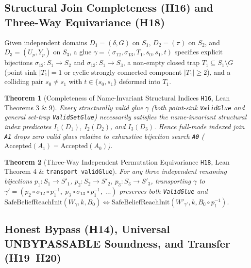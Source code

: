 \documentclass[10pt,a4paper]{article}
\newcommand{\code}[1]{\nolinkurl{#1}}
\newtheorem{theorem}{Theorem}[section]
\begin{document}
\subsection{Structural Join Completeness (H16) and Three-Way Equivariance (H18)}

Given independent domains $D_1 = (\delta, G)$ on $S_1$, $D_2 = (\pi)$ on $S_2$, and $D_3 = (U_p, Y_p)$ on $S_3$, a glue $\gamma = (\sigma_{12}, \sigma_{13}, T_1, s_0, s_1, t)$ specifies explicit bijections $\sigma_{12}: S_1 \to S_2$ and $\sigma_{13}: S_1 \to S_3$, a non-empty closed trap $T_1 \subseteq S_1 \setminus G$ (point sink $|T_1|=1$ or cyclic strongly connected component $|T_1| \ge 2$), and a colliding pair $s_0 \ne s_1$ with $t \in \{s_0, s_1\}$ deformed into $T_1$.

\begin{theorem}[Completeness of Name-Invariant Structural Indices \code{H16}, Lean Theorems 3 \& 9]\label{thm:h16}
Every structurally valid glue $\gamma$ (both point-sink \code{ValidGlue} and general set-trap \code{ValidSetGlue}) necessarily satisfies the name-invariant structural index predicates $I_1(D_1)$, $I_2(D_2)$, and $I_3(D_3)$. Hence full-mode indexed join \code{A1} drops zero valid glues relative to exhaustive bijection search \code{A0} ($\mathrm{Accepted}(A_1) = \mathrm{Accepted}(A_0)$).
\end{theorem}

\begin{theorem}[Three-Way Independent Permutation Equivariance \code{H18}, Lean Theorem 4 \& \code{transport_validGlue}]\label{thm:h18}
For any three \emph{independent} renaming bijections $p_1: S_1 \to S'_1$, $p_2: S_2 \to S'_2$, $p_3: S_3 \to S'_3$, transporting $\gamma$ to $\gamma' = (p_2 \circ \sigma_{12} \circ p_1^{-1},\; p_3 \circ \sigma_{13} \circ p_1^{-1},\; \dots)$ preserves both \code{ValidGlue} and $\mathrm{SafeBeliefReachInit}(W_\gamma, k, B_0) \iff \mathrm{SafeBeliefReachInit}(W'_{\gamma'}, k, B_0 \circ p_1^{-1})$.
\end{theorem}

\subsection{Honest Bypass (H14), Universal UNBYPASSABLE Soundness, and Transfer (H19--H20)}
\end{document}
